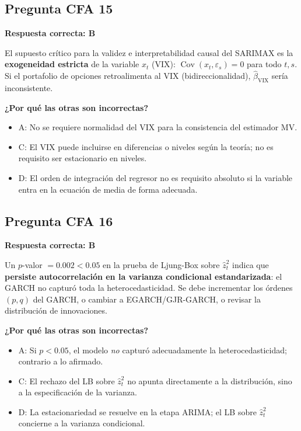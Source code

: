 \documentclass[12pt,a4paper]{article}
\DeclareMathOperator{\Cov}{Cov}
\begin{document}
\subsection*{Pregunta CFA 15}

\begin{respuestacfa}
\textbf{Respuesta correcta: B}

El supuesto crítico para la validez e interpretabilidad causal del SARIMAX es la \textbf{exogeneidad estricta} de la variable $x_t$ (VIX): $\Cov(x_t,\varepsilon_s)=0$ para todo $t,s$. Si el portafolio de opciones retroalimenta al VIX (bidireccionalidad), $\hat{\beta}_{\text{VIX}}$ sería inconsistente.

\textbf{¿Por qué las otras son incorrectas?}
\begin{itemize}[noitemsep]
  \item A: No se requiere normalidad del VIX para la consistencia del estimador MV.
  \item C: El VIX puede incluirse en diferencias o niveles según la teoría; no es requisito ser estacionario en niveles.
  \item D: El orden de integración del regresor no es requisito absoluto si la variable entra en la ecuación de media de forma adecuada.
\end{itemize}
\end{respuestacfa}

\subsection*{Pregunta CFA 16}

\begin{respuestacfa}
\textbf{Respuesta correcta: B}

Un $p$-valor $=0.002<0.05$ en la prueba de Ljung-Box sobre $\hat{z}_t^2$ indica que \textbf{persiste autocorrelación en la varianza condicional estandarizada}: el GARCH no capturó toda la heterocedasticidad. Se debe incrementar los órdenes $(p,q)$ del GARCH, o cambiar a EGARCH/GJR-GARCH, o revisar la distribución de innovaciones.

\textbf{¿Por qué las otras son incorrectas?}
\begin{itemize}[noitemsep]
  \item A: Si $p<0.05$, el modelo \emph{no} capturó adecuadamente la heterocedasticidad; contrario a lo afirmado.
  \item C: El rechazo del LB sobre $\hat{z}_t^2$ no apunta directamente a la distribución, sino a la especificación de la varianza.
  \item D: La estacionariedad se resuelve en la etapa ARIMA; el LB sobre $\hat{z}_t^2$ concierne a la varianza condicional.
\end{itemize}
\end{respuestacfa}
\end{document}
